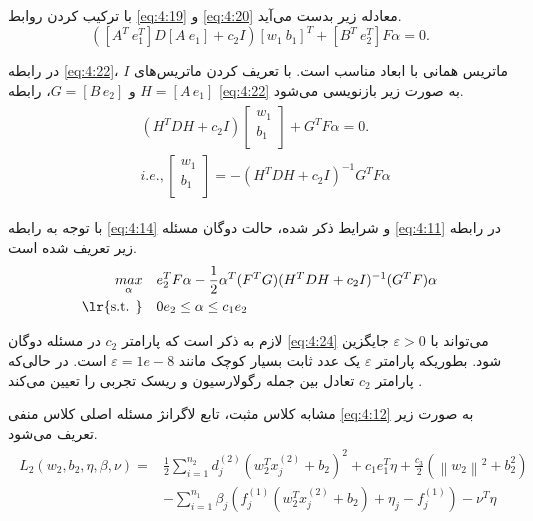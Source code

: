 با ترکیب کردن روابط \ref{eq:4:19} و \ref{eq:4:20} معادله زیر بدست می‌آید.
\begin{equation}\label{eq:4:22}
([A^{T}\ e^{T}_{1}]D[A\ e_{1}] + c_{2}I)[w_{1}\ b_{1}]^{T} + [B^{T}\ e^{T}_{2}]F\alpha = 0.
\end{equation}

در رابطه \ref{eq:4:22}، $I$  ماتریس همانی با ابعاد مناسب است. با تعریف کردن ماتریس‌های $H=[A\,e_{1}]$ و  $G=[B\,e_{2}]$، رابطه \ref{eq:4:22} به صورت زیر بازنویسی می‌شود.
\begin{align}\label{eq:4:23}
\begin{aligned}
&(H^{T}DH+c_{2}I)\left[ \begin{matrix}
{{w}_{1}}  \\
{{b}_{1}}  \\
\end{matrix} \right] + G^{T}F\alpha=0. \\
&i.e., \left[ \begin{matrix}
{{w}_{1}}  \\
{{b}_{1}}  \\
\end{matrix} \right] = -(H^{T}DH+c_{2}I)^{-1}G^{T}F\alpha
\end{aligned}
\end{align}

با توجه به رابطه \ref{eq:4:14} و شرایط  ذکر شده، حالت دوگان مسئله \ref{eq:4:11} در رابطه زیر تعریف شده است.
\begin{equation}\label{eq:4:24}
\begin{split}
\mathop{{max}}\limits_{\alpha} \quad & e_{2}^{T}F\alpha-\frac{1}{2}{{\alpha }^{T}}(F^{T}G){(H^{T}DH+c_{2}I)^{-1}}{({G}^{T}F)}\alpha   \\
\textrm{\lr{s.t. }} \quad & 0{{e}_{2}}\le \alpha \le {c_{1}}{{e}_{2}}
\end{split}
\end{equation}

لازم به ذکر است که پارامتر $c_{2}$ در مسئله دوگان \ref{eq:4:24} می‌تواند با $\varepsilon > 0$ جایگزین شود. بطوریکه پارامتر  $\varepsilon$ یک عدد ثابت بسیار کوچک مانند $\varepsilon=1e-8$ است. در حالی‌که پارامتر  $c_{2}$ تعادل بین جمله رگولارسیون و ریسک تجربی را تعیین می‌کند \cite{shao2011}.

مشابه کلاس مثبت، تابع لاگرانژ مسئله اصلی کلاس منفی \ref{eq:4:12} به صورت زیر تعریف می‌شود.
\begin{align}\label{eq:4:25}
\begin{aligned}
L_{2}(w_{2},b_{2},\eta, \beta, \nu)= &\frac{1}{2}\sum\limits_{i=1}^{n_{2}}{d^{(2)}_{j}(w^{T}_{2}x^{(2)}_{j}+b_{2})^{2}}+c_{1}e_{1}^{T}\eta+\frac{c_{3}}{2}(\left\|w_{2}\right\|^{2}+b^{2}_{2}) \\
& -\sum\limits_{i=1}^{n_{1}}{\beta_{j}(f^{(1)}_{j}(w^{T}_{2}x^{(2)}_{j}+b_{2})+\eta_{j} - f^{(1)}_{j})} - \nu^{T}\eta
\end{aligned}
\end{align}

